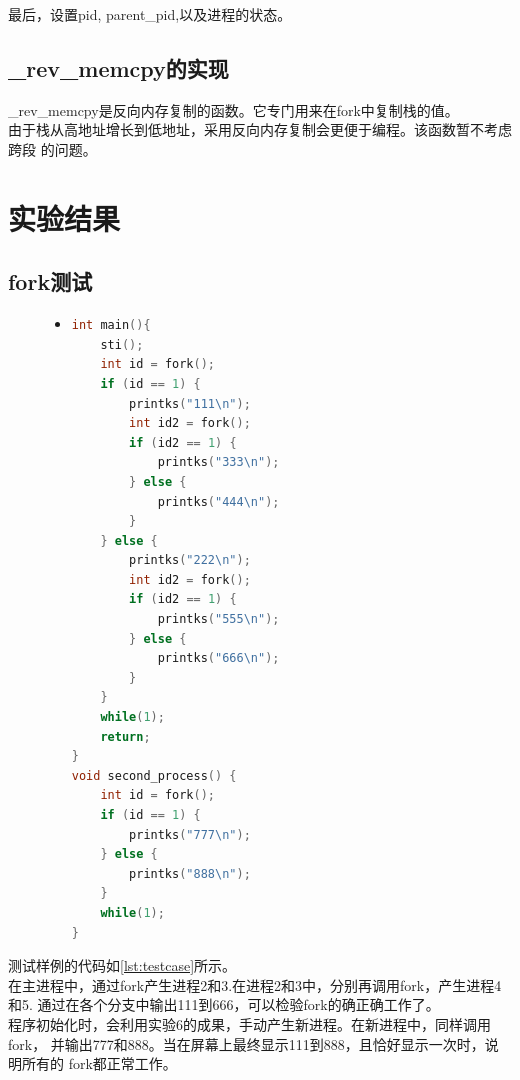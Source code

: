 \documentclass[a4paper]{article}
\begin{document}
    最后，设置pid, parent\_pid,以及进程的状态。
    \subsection{\_rev\_memcpy的实现}
    \_rev\_memcpy是反向内存复制的函数。它专门用来在fork中复制栈的值。\\ 

    由于栈从高地址增长到低地址，采用反向内存复制会更便于编程。该函数暂不考虑跨段
    的问题。
\section{实验结果}
    \subsection{fork测试}
    \begin{figure}[!hbt]
    \begin{itemize}
    \item[] \begin{lstlisting}[language=C, label=lst:testcase, caption=测试样例代码]
int main(){    
    sti();
    int id = fork();
    if (id == 1) {
        printks("111\n");
        int id2 = fork();
        if (id2 == 1) {
            printks("333\n");
        } else {
            printks("444\n");
        }
    } else {
        printks("222\n");
        int id2 = fork();
        if (id2 == 1) {
            printks("555\n");
        } else {
            printks("666\n");
        }
    }
    while(1);
    return;
}
void second_process() {
    int id = fork();
    if (id == 1) {
        printks("777\n");
    } else {
        printks("888\n");
    }
    while(1);
}
    \end{lstlisting}
    \end{itemize}
    \end{figure}
    测试样例的代码如\ref{lst:testcase}所示。\\ 
    
    在主进程中，通过fork产生进程2和3.在进程2和3中，分别再调用fork，产生进程4和5.
    通过在各个分支中输出111到666，可以检验fork的确正确工作了。\\ 

    程序初始化时，会利用实验6的成果，手动产生新进程。在新进程中，同样调用fork，
    并输出777和888。当在屏幕上最终显示111到888，且恰好显示一次时，说明所有的
    fork都正常工作。\\ 
\end{document}
